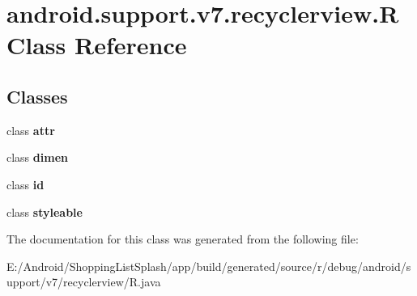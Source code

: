 \hypertarget{classandroid_1_1support_1_1v7_1_1recyclerview_1_1_r}{}\section{android.\+support.\+v7.\+recyclerview.\+R Class Reference}
\label{classandroid_1_1support_1_1v7_1_1recyclerview_1_1_r}
\subsection*{Classes}
\begin{DoxyCompactItemize}
\item 
class {\bfseries attr}
\item 
class {\bfseries dimen}
\item 
class {\bfseries id}
\item 
class {\bfseries styleable}
\end{DoxyCompactItemize}


The documentation for this class was generated from the following file\+:\begin{DoxyCompactItemize}
\item 
E\+:/\+Android/\+Shopping\+List\+Splash/app/build/generated/source/r/debug/android/support/v7/recyclerview/R.\+java\end{DoxyCompactItemize}
